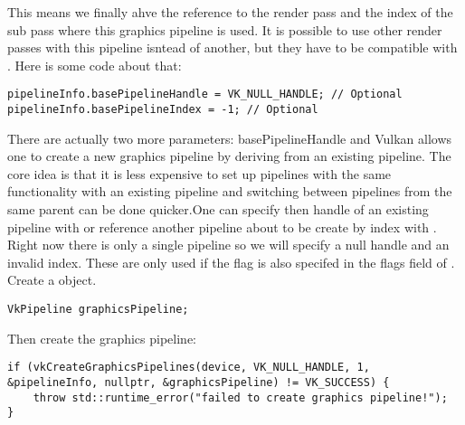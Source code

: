 \par This means we finally ahve the reference to the render pass and the index of the sub pass where this graphics pipeline is used.  It is possible to use other render passes with this pipeline isntead of another, but they have to be compatible with . Here is some code about that:

\begin{center}
\begin{minipage}{0.95\linewidth}
\begin{lstlisting}
pipelineInfo.basePipelineHandle = VK_NULL_HANDLE; // Optional
pipelineInfo.basePipelineIndex = -1; // Optional
\end{lstlisting}
\end{minipage}
\end{center}

\par There are actually two more parameters: basePipelineHandle and  Vulkan allows one to create a new graphics pipeline by deriving from an existing pipeline. The core idea is that it is less expensive to set up pipelines with the same functionality with an existing pipeline and switching between pipelines from the same parent can be done quicker.One can specify then handle of an existing pipeline with  or reference another pipeline about to be create by index with . Right now there is only a single pipeline so we will specify a null handle and an invalid index. These are only used if the  flag is also specifed in the flags field of . Create a  object.

\begin{center}
\begin{minipage}{0.95\linewidth}
\begin{lstlisting}
VkPipeline graphicsPipeline;
\end{lstlisting}
\end{minipage}
\end{center}


\par Then create the graphics pipeline:

\begin{center}
\begin{minipage}{0.95\linewidth}
\begin{lstlisting}
if (vkCreateGraphicsPipelines(device, VK_NULL_HANDLE, 1, &pipelineInfo, nullptr, &graphicsPipeline) != VK_SUCCESS) {
    throw std::runtime_error("failed to create graphics pipeline!");
}
\end{lstlisting}
\end{minipage}
\end{center}

